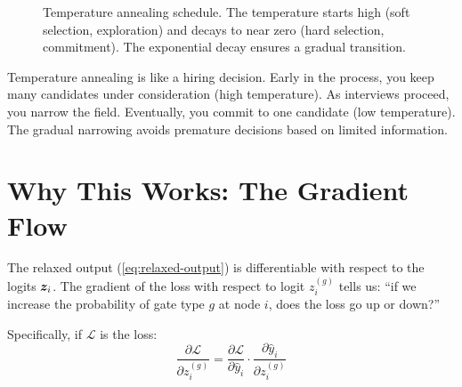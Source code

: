 \begin{figure}[htbp]
\centering
{}
\caption{Temperature annealing schedule. The temperature starts high
  (soft selection, exploration) and decays to near zero (hard
  selection, commitment). The exponential decay ensures a gradual
  transition.}
\label{fig:annealing}
\end{figure}

\begin{analogy}
Temperature annealing is like a hiring decision. Early in the process,
you keep many candidates under consideration (high temperature). As
interviews proceed, you narrow the field. Eventually, you commit to
one candidate (low temperature). The gradual narrowing avoids premature
decisions based on limited information.
\end{analogy}


\section{Why This Works: The Gradient Flow}
\label{sec:gradient-flow}

The relaxed output (\cref{eq:relaxed-output}) is differentiable with
respect to the logits $\bm{z}_i$. The gradient of the loss with
respect to logit $z_i^{(g)}$ tells us: ``if we increase the
probability of gate type $g$ at node $i$, does the loss go up or
down?''

Specifically, if $\mathcal{L}$ is the loss:
\begin{equation}
  \frac{\partial \mathcal{L}}{\partial z_i^{(g)}} =
    \frac{\partial \mathcal{L}}{\partial \hat{y}_i} \cdot
    \frac{\partial \hat{y}_i}{\partial z_i^{(g)}}
  \label{eq:gate-grad}
\end{equation}

